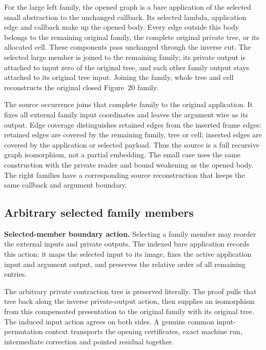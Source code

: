 For the large left family, the opened graph is a bare application of the
selected small abstraction to the unchanged callback. Its selected lambda,
application edge and callback make up the opened body. Every edge outside this
body belongs to the remaining original family, the complete original private
tree, or its allocated cell. These components pass unchanged through the
inverse cut. The selected large member is joined to the remaining family;
its private output is attached to input zero of the original tree, and each
other family output stays attached to its original tree input. Joining the
family, whole tree and cell reconstructs the original closed Figure~20 family.

The source occurrence joins that complete family to the original application.
It fixes all external family input coordinates and leaves the argument wire
as its output. Edge coverage distinguishes retained edges from the inserted
frame edges: retained edges are covered by the remaining family, tree or cell;
inserted edges are covered by the application or selected payload. Thus the
source is a full recursive graph isomorphism, not a partial embedding. The
small case uses the same construction with the private reader and bound
weakening as the opened body. The right families have a corresponding source
reconstruction that keeps the same callback and argument boundary.

\subsection{Arbitrary selected family members}
\textbf{Selected-member boundary action.} Selecting a family member may
reorder the external inputs and private outputs. The indexed bare application
records this action: it maps the selected input to its image, fixes the active
application input and argument output, and preserves the relative order of all
remaining entries.

The arbitrary private contraction tree is preserved literally. The proof
pulls that tree back along the inverse private-output action, then supplies an
isomorphism from this compensated presentation to the original family with
its original tree. The induced input action agrees on both sides. A genuine
common input-permutation context transports the opening certificates, exact
machine run, intermediate correction and pointed residual together.

